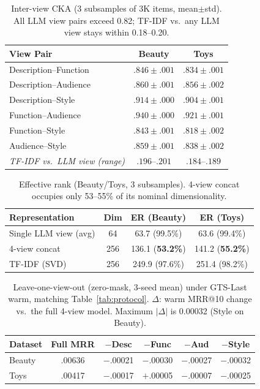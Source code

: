 \documentclass[sigconf,natbib=true,anonymous]{acmart}
\begin{document}
\begin{table}[t]
\centering
\caption{%
Inter-view CKA (3 subsamples of 3K items, mean$\pm$std).
All LLM view pairs exceed 0.82; TF-IDF vs.\ any LLM view stays within 0.18--0.20.%
}
\label{tab:cka}
\small
\setlength{\tabcolsep}{4pt}
\begin{tabular}{@{}lcc@{}}
\toprule
View Pair & Beauty & Toys \\
\midrule
Description--Function  & $.846 \pm .001$ & $.834 \pm .001$ \\
Description--Audience  & $.860 \pm .001$ & $.856 \pm .002$ \\
Description--Style     & $.914 \pm .000$ & $.904 \pm .001$ \\
Function--Audience     & $.940 \pm .000$ & $.921 \pm .001$ \\
Function--Style        & $.843 \pm .001$ & $.818 \pm .002$ \\
Audience--Style        & $.859 \pm .001$ & $.838 \pm .002$ \\
\midrule
\emph{TF-IDF vs.\ LLM view (range)} & $.196$--$.201$ & $.184$--$.189$ \\
\bottomrule
\end{tabular}
\end{table}

\begin{table}[t]
\centering
\caption{%
Effective rank (Beauty/Toys, 3 subsamples).
4-view concat occupies only 53--55\% of its nominal dimensionality.%
}
\label{tab:effrank}
\small
\begin{tabular}{@{}lccc@{}}
\toprule
Representation & Dim & ER (Beauty) & ER (Toys) \\
\midrule
Single LLM view (avg) & 64 & 63.7 (99.5\%) & 63.6 (99.4\%) \\
4-view concat & 256 & 136.1 (\textbf{53.2\%}) & 141.2 (\textbf{55.2\%}) \\
TF-IDF (SVD) & 256 & 249.9 (97.6\%) & 251.4 (98.2\%) \\
\bottomrule
\end{tabular}
\end{table}

\begin{table}[t]
\centering
\caption{%
Leave-one-view-out (zero-mask, 3-seed mean) under GTS-Last warm, matching Table~\ref{tab:protocol}.
$\Delta$: warm MRR@10 change vs.\ the full 4-view model.
Maximum $|\Delta|$ is 0.00032 (Style on Beauty).%
}
\label{tab:loov}
\small
\setlength{\tabcolsep}{3.5pt}
\begin{tabular}{@{}lccccc@{}}
\toprule
Dataset & Full MRR & $-$Desc & $-$Func & $-$Aud & $-$Style \\
\midrule
Beauty & .00636 & $-$.00021 & $-$.00030 & $-$.00027 & $-$.00032 \\
Toys   & .00417 & $-$.00017 & $+$.00005 & $-$.00007 & $-$.00025 \\
\bottomrule
\end{tabular}
\end{table}
\end{document}
